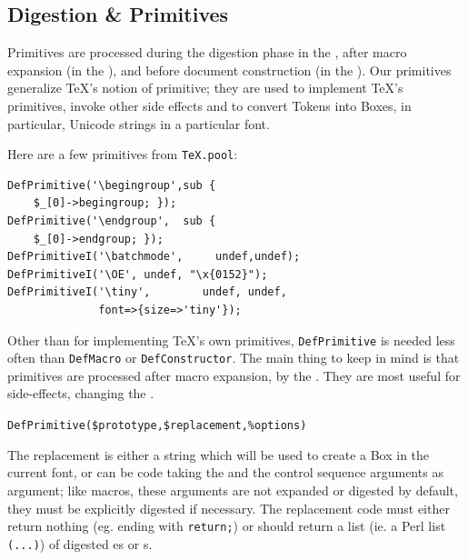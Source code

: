 \documentclass{book}
\newcommand{\ltxcode}{\lstinline[style=latexml]}
\begin{document}

\subsection[Digestion]{Digestion \& Primitives}\label{customization.latexml.digestion}
Primitives are processed during the digestion phase in the ,
after macro expansion (in the ),
and before document construction (in the ).
Our primitives generalize \TeX's notion of primitive; they are used to implement
\TeX's primitives, invoke other side effects and to convert Tokens into Boxes,
in particular, Unicode strings in a particular font.

Here are a few primitives from \texttt{TeX.pool}:
\begin{lstlisting}[style=latexml]
DefPrimitive('\begingroup',sub {
    $_[0]->begingroup; });
DefPrimitive('\endgroup',  sub {
    $_[0]->endgroup; });
DefPrimitiveI('\batchmode',     undef,undef);
DefPrimitiveI('\OE', undef, "\x{0152}");
DefPrimitiveI('\tiny',        undef, undef,
              font=>{size=>'tiny'});
\end{lstlisting}

Other than for implementing \TeX's own primitives,
\texttt{DefPrimitive} is needed less often than \texttt{DefMacro} or \texttt{DefConstructor}.
 The main thing to keep in mind
is that primitives are processed after macro expansion,
by the .  They are most useful for
side-effects, changing the .

\par\noindent\ltxcode|DefPrimitive($prototype,$replacement,%
\par

The replacement is either a string which will be used to create
a Box in the current font, or can be code taking the 
and the control sequence arguments as argument; like macros, these arguments
are not expanded or digested by default, they must be explicitly digested if necessary.
The replacement code must either return nothing (eg. ending with \ltxcode|return;|) or
should return a list (ie. a Perl list \ltxcode|(...)|)
of digested es or s.
\end{document}
